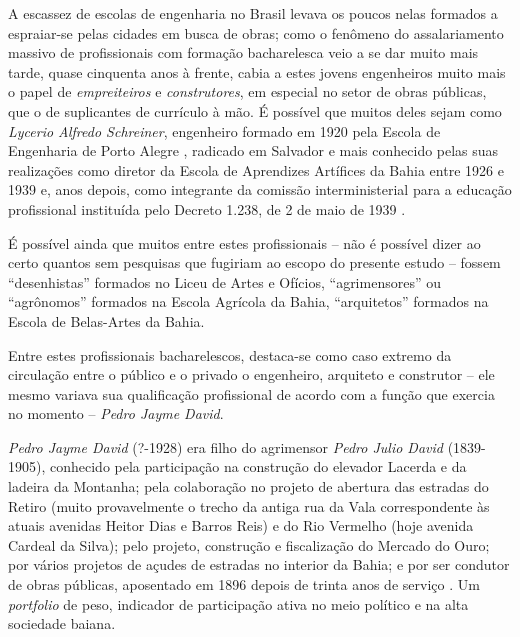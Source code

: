 A escassez de escolas de engenharia no Brasil levava os poucos nelas formados a espraiar-se pelas cidades em busca de obras; como o fenômeno do assalariamento massivo de profissionais com formação bacharelesca veio a se dar muito mais tarde, quase cinquenta anos à frente, cabia a estes jovens engenheiros muito mais o papel de \textit{empreiteiros} e \textit{construtores}, em especial no setor de obras públicas, que o de suplicantes de currículo à mão. É possível que muitos deles sejam como \textit{Lycerio Alfredo Schreiner}, engenheiro formado em 1920 pela Escola de Engenharia de Porto Alegre \cite{lersch_engenhariapoa_2014}, radicado em Salvador e mais conhecido pelas suas realizações como diretor da Escola de Aprendizes Artífices da Bahia entre 1926 e 1939 \cite{moreira_escolaartifices_2009} e, anos depois, como integrante da comissão interministerial para a educação profissional instituída pelo Decreto 1.238, de 2 de maio de 1939 \cite[p.~184]{almeida_ensinoindustrial_2010}. 

É possível ainda que muitos entre estes profissionais -- não é possível dizer ao certo quantos sem pesquisas que fugiriam ao escopo do presente estudo -- fossem ``desenhistas'' formados no Liceu de Artes e Ofícios, ``agrimensores'' ou  ``agrônomos'' formados na Escola Agrícola da Bahia, ``arquitetos'' formados na Escola de Belas-Artes da Bahia. 

Entre estes profissionais bacharelescos, destaca-se como caso extremo da circulação entre o público e o privado o engenheiro, arquiteto e construtor -- ele mesmo variava sua qualificação profissional de acordo com a função que exercia no momento -- \textit{Pedro Jayme David}.
 
\textit{Pedro Jayme David} (?-1928) era filho do agrimensor \textit{Pedro Julio David} (1839-1905), conhecido pela participação na construção do elevador Lacerda e da ladeira da Montanha; pela colaboração no projeto de abertura das estradas do Retiro (muito provavelmente o trecho da antiga rua da Vala correspondente às atuais avenidas Heitor Dias e Barros Reis) e do Rio Vermelho (hoje avenida Cardeal da Silva); pelo projeto, construção e fiscalização do Mercado do Ouro; por vários projetos de açudes de estradas no interior da Bahia; e por ser condutor de obras públicas, aposentado em 1896 depois de trinta anos de serviço \cite[pp.~327-328]{querino_artistas_2018}. Um \textit{portfolio} de peso, indicador de participação ativa no meio político e na alta sociedade baiana.

